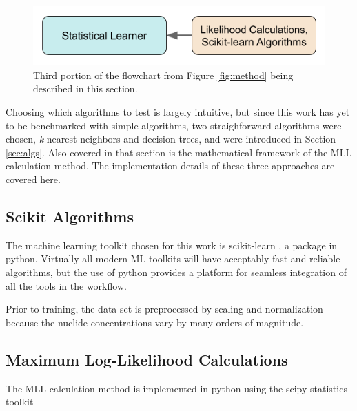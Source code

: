 
\begin{figure}[H]
  \centering
  \includegraphics[width=0.7\linewidth]{./chapters/method/methodology3.png}
  \caption{Third portion of the flowchart from Figure \ref{fig:method} being 
           described in this section.}
\end{figure}

Choosing which algorithms to test is largely intuitive, but since this work has
yet to be benchmarked with simple algorithms, two straighforward algorithms
were chosen, \textit{k}-nearest neighbors and decision trees, and were
introduced in Section \ref{sec:algs}. Also covered in that section is the
mathematical framework of the \gls{MLL} calculation method. The implementation
details of these three approaches are covered here. 

\subsection{Scikit Algorithms}
\label{sec:scikit}

The machine learning toolkit chosen for this work is scikit-learn
\cite{scikit}, a package in python.  Virtually all modern \gls{ML} toolkits
will have acceptably fast and reliable algorithms, but the use of python
provides a platform for seamless integration of all the tools in the workflow. 

Prior to training, the data set is preprocessed by scaling and normalization
because the nuclide concentrations vary by many orders of magnitude. 

\subsection{Maximum Log-Likelihood Calculations}
\label{sec:mll}

The \gls{MLL} calculation method is implemented in python using the scipy 
statistics toolkit \cite{scipy}
